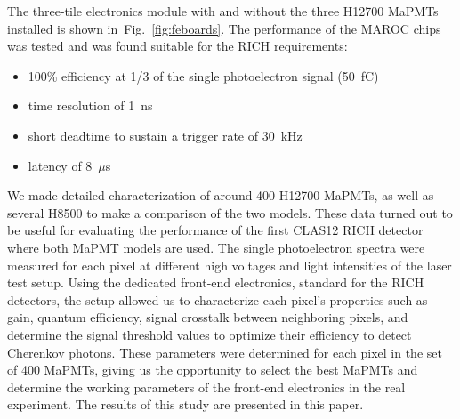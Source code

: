 The three-tile electronics module with and without the three H12700 MaPMTs installed is shown in~Fig.~\ref{fig:feboards}.
The performance of the MAROC chips was tested and was found suitable for the RICH requirements:
\begin{itemize}
	\item 100\% efficiency at 1/3 of the single photoelectron signal (50~fC)
	\item time resolution of 1~ns
	\item short deadtime to sustain a trigger rate of 30~kHz
	\item latency of 8~$\mu$s
\end{itemize}
We made detailed characterization of around 400 H12700 MaPMTs, as well as several H8500 to make a comparison of the two models.
These data turned out to be useful for evaluating the performance of the first CLAS12 RICH detector where both MaPMT models are used.
The single photoelectron spectra were measured for each pixel at different high voltages and light intensities of the laser test setup.
Using the dedicated front-end electronics, standard for the RICH detectors, the setup allowed us to characterize each pixel’s properties such as gain, quantum efficiency, signal crosstalk between neighboring pixels, and determine the signal threshold values to optimize their efficiency to detect Cherenkov photons.
These parameters were determined for each pixel in the set of 400 MaPMTs, giving us the opportunity to select the best MaPMTs and determine the working parameters of the front-end electronics in the real experiment.
The results of this study are presented in this paper. 


